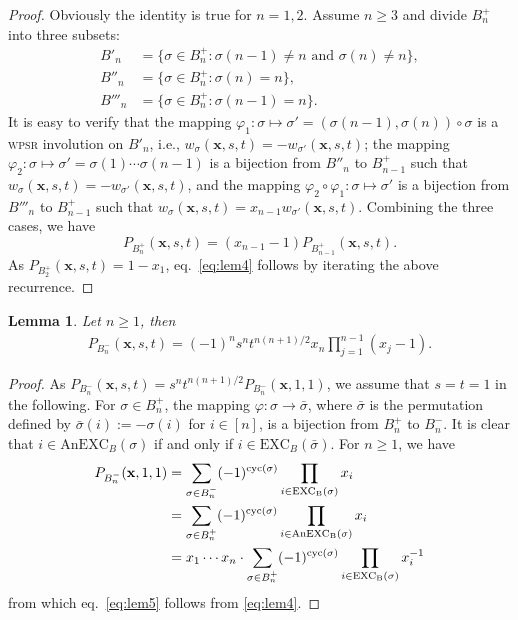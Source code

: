 \documentclass[12pt,reqno]{amsart}
\numberwithin{equation}{section}
\newcommand\cyc{\mathop{ \rm cyc}}
\def\S{\mathfrak{ S}}
\def\x{\mathbf{ x}}
\def\cyc{\mathop{\rm cyc}}
\def\pos{\mathop{\rm pos}\nolimits}
\newtheorem{lem}{Lemma}
\begin{document}
\begin{proof}
Obviously the identity is true for $n=1, 2$.
Assume $n\ge 3$ and  divide $B^+_n$ into three subsets:
\begin{align*}
		B'_{n}&=\{\sigma\in B^{+}_n:\sigma(n-1)\neq n\text{ and } \sigma(n)\neq n \},\\
		B''_n&=\{\sigma\in B^{+}_n:\sigma(n)=n \},\\
		B'''_n&=\{\sigma\in B^{+}_n:\sigma(n-1)=n\}.
\end{align*}
It is easy to verify that the mapping 
$\varphi_1: \sigma \mapsto \sigma'=(\sigma(n-1),\sigma(n))\circ\sigma$ is a \textsc{wpsr} involution on $B'_{n}$, 
i.e., $w_\sigma(\x,s,t)=-w_{\sigma'}(\x,s,t)$;
the mapping $\varphi_2:\sigma\mapsto\sigma'=\sigma(1)\cdots\sigma(n-1)$ is 
a bijection from $B''_n$ to $B^+_{n-1}$ such that $w_\sigma(\x,s,t)=-w_{\sigma'}(\x,s,t)$, and the mapping
$\varphi_2\circ \varphi_1: \sigma\mapsto\sigma'$ is a bijection from $B'''_n$ to $B^+_{n-1}$ such that $w_\sigma(\x,s,t)=x_{n-1}w_{\sigma'}(\x,s,t)$.
Combining the three cases, 
 we have 
$$P_{B_n^+}(\x,s,t)=(x_{n-1}-1)P_{B_{n-1}^+}(\x,s,t).$$
As $ P_{B_2^+}(\x,s,t)=1-x_1 $, 
eq.~\eqref{eq:lem4}  follows by iterating the above recurrence.
\end{proof}

\begin{lem}\label{lem5}
	Let $n\ge1$, then
	\begin{align}\label{eq:lem5}
		P_{B_n^-}(\x,s,t)=
		(-1)^ns^nt^{n(n+1)/2}x_n\prod^{n-1}_{j=1}(x_j-1).
	\end{align}
\end{lem}

\begin{proof} 
	As $P_{B_n^-}(\x,s,t)=s^nt^{n(n+1)/2}P_{B_n^-}(\x,1,1)$, we assume that $s=t=1$ in the following. For $\sigma\in B^+_n$, the mapping 
	$\varphi: \sigma\to \bar\sigma$, where
	$\bar \sigma$ is the permutation defined by
	$\bar \sigma(i):=-\sigma(i)$ for $i\in [n]$, is a bijection from $B_n^+$ to $B_n^-$.
	It is clear that 
	$i\in \mathrm{AnEXC}_B(\sigma)$ if and only if $i\in \mathrm{EXC}_B(\bar \sigma)$.
	For $n\ge 1$, we have 
	\begin{align*}
		P_{B_n^-}(\x,1,1)&= \sum_{\sigma\in B^-_n}(-1)^{\cyc(\sigma)}\prod_{i\in \mathrm{EXC_B(\sigma)}}x_i\\
		&=\sum_{\sigma\in B^+_n }(-1)^{\cyc(\sigma)}\prod_{i\in \mathrm{AnEXC_B(\sigma)}}x_i\\
		&=x_1\cdots x_n\cdot\sum_{\sigma\in B^+_n}(-1)^{\cyc(\sigma)}\prod_{i\in\mathrm{EXC_B(\sigma)}}x_i^{-1}
	\end{align*}
	from which eq.~\eqref{eq:lem5}  follows from \eqref{eq:lem4}.
\end{proof}
\end{document}
